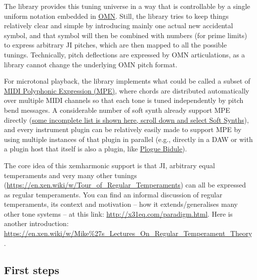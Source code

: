 \documentclass[11pt]{article}
\begin{document}
The library provides this tuning universe in a way that is controllable by a single uniform
notation embedded in \href{https://opusmodus.com/forums/tutorials/omn-the-language/}{OMN}. Still, the library tries to keep things relatively clear and simple by
introducing mainly one actual new accidental symbol, and that symbol will then be combined with
numbers (for prime limits) to express arbitrary JI pitches, which are then mapped to all the
possible tunings.  Technically, pitch deflections are expressed by OMN articulations, as a
library cannot change the underlying OMN pitch format.

For microtonal playback, the library implements what could be called a subset of \href{https://www.midi.org/midi-articles/midi-polyphonic-expression-mpe}{MIDI Polyphonic
Expression (MPE)}, where chords are distributed automatically over multiple MIDI channels so that
each tone is tuned independently by pitch bend messages. A considerable number of soft synth
already support MPE directly (\href{https://roli.com/mpe}{some incomplete list is shown here, scroll down and select Soft
Synths}), and every instrument plugin can be relatively easily made to support MPE by
using multiple instances of that plugin in parallel (e.g., directly in a DAW or with a plugin
host that itself is also a plugin, like \href{https://www.plogue.com/products/bidule.html}{Plogue Bidule}).


The core idea of this xemharmonic support is that JI, arbitrary equal temperaments and very many
other tunings (\url{https://en.xen.wiki/w/Tour\_of\_Regular\_Temperaments}) can all be expressed as
regular temperaments. You can find an informal discussion of regular temperaments, its context
and motivation -- how it extends/generalises many other tone systems -- at this link:
\url{http://x31eq.com/paradigm.html}. Here is another introduction: \url{https://en.xen.wiki/w/Mike\%27s\_Lectures\_On\_Regular\_Temperament\_Theory}. 


\subsection{First steps}
\label{sec:orge119a95}
\end{document}
